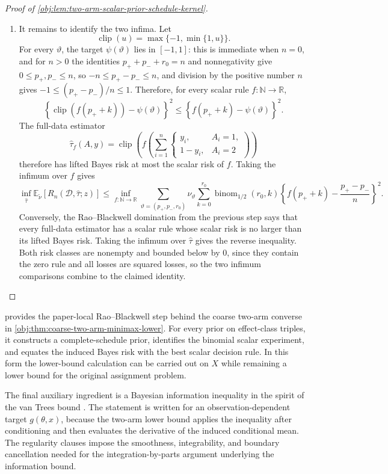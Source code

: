 \documentclass[11pt]{article}
\begin{document}
\begin{proof}[Proof of \cref{obj:lem:two-arm-scalar-prior-schedule-kernel}]
\begin{enumerate}
\item It remains to identify the two infima.  Let
\[
\operatorname{clip}(u)=\max\{-1,\min\{1,u\}\}.
\]
For every \(\vartheta\), the target \(\psi(\vartheta)\) lies in \([-1,1]\): this is immediate when \(n=0\), and for \(n>0\) the identities \(p_++p_-+r_0=n\) and nonnegativity give \(0\le p_+,p_-\le n\), so \(-n\le p_+-p_-\le n\), and division by the positive number \(n\) gives \(-1\le (p_+-p_-)/n\le 1\).  Therefore, for every scalar rule \(f:\mathbb N\to\mathbb R\),
\[
\left\{\operatorname{clip}(f(p_+ + k))-\psi(\vartheta)\right\}^2
\le
\left\{f(p_+ + k)-\psi(\vartheta)\right\}^2.
\]
The full-data estimator
\[
\widehat\tau_f(A,y)
=
\operatorname{clip}\!\left(
f\!\left(\sum_{i=1}^n
\begin{cases}
y_i,&A_i=1,\\
1-y_i,&A_i=2
\end{cases}\right)\right)
\]
therefore has lifted Bayes risk at most the scalar risk of \(f\).  Taking the infimum over \(f\) gives
\[
\inf_{\widehat\tau}
\mathbb E_{\widetilde\nu}\!\left[
R_n(\mathcal D,\widehat\tau;z)
\right]
\le
\inf_{f:\mathbb N\to\mathbb R}
\sum_{\vartheta=(p_+,p_-,r_0)}
\nu_\vartheta
\sum_{k=0}^{r_0}
\operatorname{binom}_{1/2}(r_0,k)
\left\{
f(p_+ + k)-\frac{p_+-p_-}{n}
\right\}^2 .
\]
Conversely, the Rao--Blackwell domination from the previous step says that every full-data estimator has a scalar rule whose scalar risk is no larger than its lifted Bayes risk.  Taking the infimum over \(\widehat\tau\) gives the reverse inequality.  Both risk classes are nonempty and bounded below by \(0\), since they contain the zero rule and all losses are squared losses, so the two infimum comparisons combine to the claimed identity. %
\end{enumerate}
\end{proof}

 provides the paper-local Rao--Blackwell step behind the coarse two-arm converse in \cref{obj:thm:coarse-two-arm-minimax-lower}. For every prior on effect-class triples, it constructs a complete-schedule prior, identifies the binomial scalar experiment, and equates the induced Bayes risk with the best scalar decision rule. In this form the lower-bound calculation can be carried out on \(X\) while remaining a lower bound for the original assignment problem.

The final auxiliary ingredient is a Bayesian information inequality in the spirit of the van Trees bound \citep{van_trees_1968,gill_1995}. The statement is written for an observation-dependent target \(g(\theta,x)\), because the two-arm lower bound applies the inequality after conditioning and then evaluates the derivative of the induced conditional mean. The regularity clauses impose the smoothness, integrability, and boundary cancellation needed for the integration-by-parts argument underlying the information bound.
\end{document}
